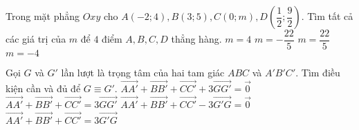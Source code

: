 \begin{ex}%
	Trong mặt phẳng $Oxy$ cho $A(-2;4), B(3;5), C(0;m), D\left(\dfrac{1}{2}; \dfrac{9}{2} \right)$. Tìm tất cả các giá trị của $m$ để  $4$ điểm $A, B, C, D$ thẳng hàng.
	\choice
	{$m=4$}
	{$m=-\dfrac{22}{5}$}
	{\True $m=\dfrac{22}{5}$}
	{$m=-4$}
\end{ex}

\begin{ex}%
	Gọi $G$ và $G'$ lần lượt là trọng tâm của hai tam giác $ABC$ và $A'B'C'$. Tìm điều kiện cần và đủ để $G \equiv G'$.
	\choice
	{$\vec{AA'}+\vec{BB'}+\vec{CC'}+3\vec{GG'}=\vec{0}$}
	{$\vec{AA'}+\vec{BB'}+\vec{CC'}=3\vec{GG'}$}
	{$\vec{AA'}+\vec{BB'}+\vec{CC'}-3\vec{G'G}=\vec{0}$}
	{\True  $\vec{AA'}+\vec{BB'}+\vec{CC'}=3\vec{G'G}$}
\end{ex}

